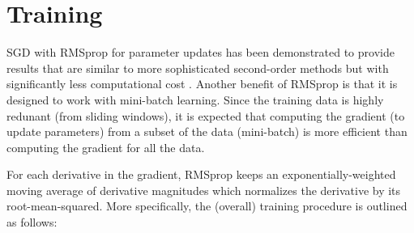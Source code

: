 \section{Training}


SGD with RMSprop \cite{Tieleman2012} for parameter updates has been demonstrated to provide results that are similar to more sophisticated second-order methods but with significantly less computational cost \cite{Dauphin}.
%
Another benefit of RMSprop is that it is designed to work with mini-batch learning.
%
Since the training data is highly redunant (from sliding windows), it is expected that computing the gradient (to update parameters) from a subset of the data (mini-batch) is more efficient than computing the gradient for all the data.


For each derivative in the gradient, RMSprop keeps an exponentially-weighted moving average of derivative magnitudes which normalizes the derivative by its root-mean-squared.
%
More specifically, the (overall) training procedure is outlined as follows:

